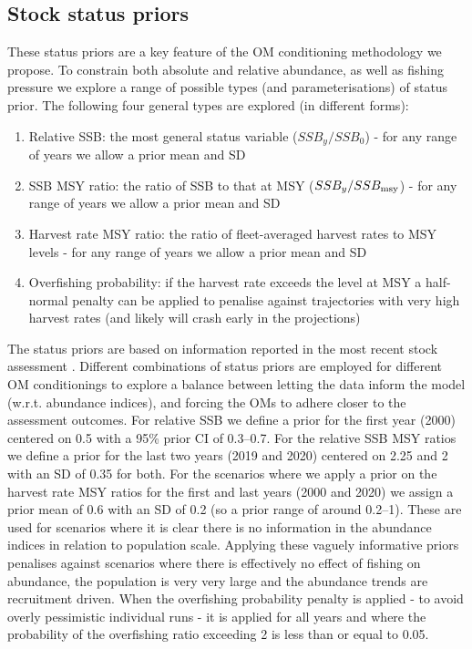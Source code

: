 \documentclass[11pt]{article}
\begin{document}
\subsection{Stock status priors}

These status priors are a key feature of the OM conditioning methodology we propose. To constrain both absolute and relative abundance, as well as fishing pressure we explore a range of possible types (and parameterisations) of status prior. The following four general types are explored (in different forms):

\begin{enumerate}
    \item Relative SSB: the most general status variable ($SSB_y/SSB_0$) - for any range of years we allow a prior mean and SD
    \item SSB MSY ratio: the ratio of SSB to that at MSY ($SSB_y/SSB_{\rm msy}$) - for any range of years we allow a prior mean and SD
    \item Harvest rate MSY ratio: the ratio of fleet-averaged harvest rates to MSY levels - for any range of years we allow a prior mean and SD
    \item Overfishing probability: if the harvest rate exceeds the level at MSY a half-normal penalty can be applied to penalise against trajectories with very high harvest rates (and likely will crash early in the projections)
\end{enumerate}

The status priors are based on information reported in the most recent stock assessment \cite{albsa}. Different combinations of status priors are employed for different OM conditionings to explore a balance between letting the data inform the model (w.r.t. abundance indices), and forcing the OMs to adhere closer to the assessment outcomes. For relative SSB we define a prior for the first year (2000) centered on 0.5 with a 95\% prior CI of 0.3--0.7. For the relative SSB MSY ratios we define a prior for the last two years (2019 and 2020) centered on 2.25 and 2 with an SD of 0.35 for both. For the scenarios where we apply a prior on the harvest rate MSY ratios for the first and last years (2000 and 2020) we assign a prior mean of 0.6 with an SD of 0.2 (so a prior range of around 0.2--1). These are used for scenarios where it is clear there is no information in the abundance indices in relation to population scale. Applying these vaguely informative priors penalises against scenarios where there is effectively no effect of fishing on abundance, the population is very very large and the abundance trends are recruitment driven. When the overfishing probability penalty is applied - to avoid overly pessimistic individual runs - it is applied for all years and where the probability of the overfishing ratio exceeding 2 is less than or equal to 0.05.
\end{document}
